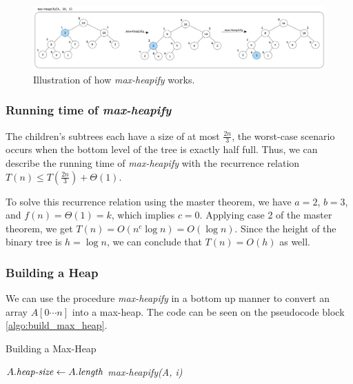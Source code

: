 \documentclass[a4paper,10pt]{article}
\newcommand{\hlt}[1]{\colorbox{color3}{#1}}
\begin{document}
\begin{figure}[ht]
\centering
\includegraphics[width=\linewidth]{figures/op_max_heapify.png}
\caption{Illustration of how \textit{max-heapify} works.}
\label{fig:op_max_heapify}
\end{figure}

\subsubsection{Running time of \textit{max-heapify}}

The children's subtrees each have a size of at most \( \frac{2n}{3} \), the worst-case scenario occurs when the bottom level of the tree is exactly half full. Thus, we can describe the running time of \textit{max-heapify} with the recurrence relation \( T(n) \leq T\left(\frac{2n}{3}\right) + \Theta(1) \).

To solve this recurrence relation using the master theorem, we have \( a = 2 \), \( b = 3 \), and \( f(n) = \Theta(1) = k \), which implies \( c = 0 \). Applying case 2 of the master theorem, we get \( T(n) = O(n^c \log n) = O(\log n) \). Since the height of the binary tree is \hlt{\( h = \log n \)}, we can conclude that \hlt{\( T(n) = O(h) \)} as well.

\subsubsection{Building a Heap}

We can use the procedure \textit{max-heapify} in a bottom up manner to convert an array $A[0 \cdots n]$ into a max-heap. The code can be seen on the pseudocode block \ref{algo:build_max_heap}. 

\begin{algorithm}
    \caption{Building a Max-Heap}
    \begin{algorithmic}[1]
            \State $A.\text{\textit{heap-size}} \gets A.\text{\textit{length}}$
                \State \textit{max-heapify(A, i)}
            \EndFor
        \EndFunction
    \end{algorithmic}
    \label{algo:build_max_heap}
\end{algorithm}
\end{document}

